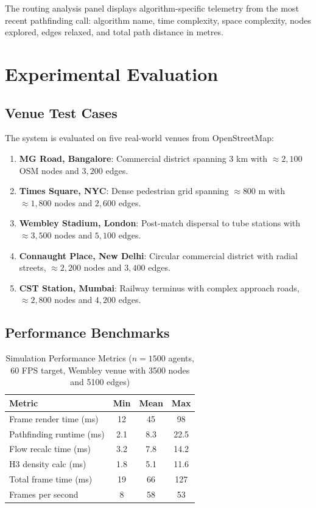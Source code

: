 \documentclass[conference]{IEEEtran}
\begin{document}
The routing analysis panel displays algorithm-specific telemetry from the most recent pathfinding call: algorithm name, time complexity, space complexity, nodes explored, edges relaxed, and total path distance in metres.

\section{Experimental Evaluation}

\subsection{Venue Test Cases}

The system is evaluated on five real-world venues from OpenStreetMap:

\begin{enumerate}
\item \textbf{MG Road, Bangalore}: Commercial district spanning 3 km with $\approx 2,100$ OSM nodes and $3,200$ edges.
\item \textbf{Times Square, NYC}: Dense pedestrian grid spanning $\approx 800$ m with $\approx 1,800$ nodes and $2,600$ edges.
\item \textbf{Wembley Stadium, London}: Post-match dispersal to tube stations with $\approx 3,500$ nodes and $5,100$ edges.
\item \textbf{Connaught Place, New Delhi}: Circular commercial district with radial streets, $\approx 2,200$ nodes and $3,400$ edges.
\item \textbf{CST Station, Mumbai}: Railway terminus with complex approach roads, $\approx 2,800$ nodes and $4,200$ edges.
\end{enumerate}

\subsection{Performance Benchmarks}

\begin{table}[ht]
\centering
\caption{Simulation Performance Metrics ($n=1500$ agents, 60 FPS target, Wembley venue with 3500 nodes and 5100 edges)}
\label{tab:performance}
\renewcommand{\arraystretch}{1.15}
\begin{tabular}{|l|c|c|c|}
\hline
\textbf{Metric} & \textbf{Min} & \textbf{Mean} & \textbf{Max} \\
\hline
Frame render time (ms) & 12 & 45 & 98 \\
\hline
Pathfinding runtime (ms) & 2.1 & 8.3 & 22.5 \\
\hline
Flow recalc time (ms) & 3.2 & 7.8 & 14.2 \\
\hline
H3 density calc (ms) & 1.8 & 5.1 & 11.6 \\
\hline
Total frame time (ms) & 19 & 66 & 127 \\
\hline
Frames per second & 8 & 58 & 53 \\
\hline
\end{tabular}
\end{table}
\end{document}
